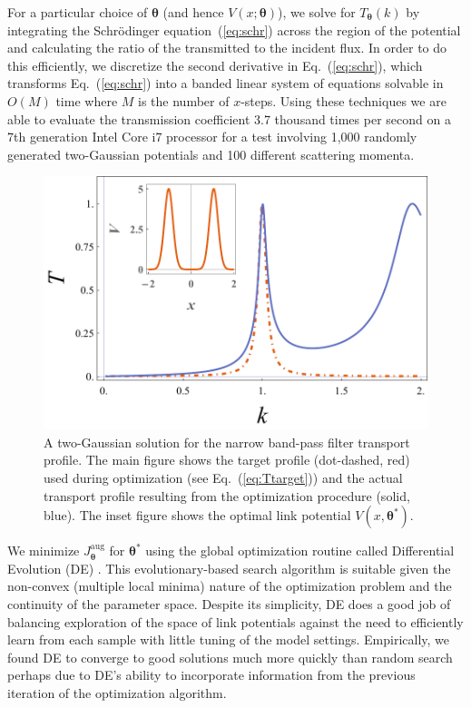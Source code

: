 \documentclass[reprint, twocolumn,amsmath,amssymb,showpacs,pra,superscriptaddress,aps]{revtex4-1}
\begin{document}
For a particular choice of $\bm{\theta}$ (and hence $V(x;\bm{\theta})$), we solve for $T_{\bm{\theta}}(k)$ by integrating the Schr{\"o}dinger equation~(\ref{eq:schr}) across the region of the potential and calculating the ratio of the transmitted to the incident flux. In order to do this efficiently, we discretize the second derivative in Eq.~(\ref{eq:schr}), which transforms Eq.~(\ref{eq:schr}) into
a banded linear system of equations solvable in $O(M)$ time where $M$ is the number of $x$-steps. Using these techniques we are able to evaluate the transmission coefficient 3.7 thousand times per second on a 7th generation Intel Core i7 processor for a test involving 1,000 randomly generated two-Gaussian potentials and 100 different scattering momenta. 

\begin{figure}
   \includegraphics[width=1\linewidth]{plot_transport_profiles_with_inset.pdf}
 \caption[Narrow band-pass filter link potential]{A two-Gaussian solution for the narrow band-pass filter transport profile. The main figure shows the target profile (dot-dashed, red) used during optimization (see Eq.~(\ref{eq:Ttarget})) and the actual transport profile resulting from the optimization procedure (solid, blue). The inset figure shows the optimal link potential $V(x, \bm{\theta^*})$.}
 \label{fig:method_illustration}
\end{figure}


We minimize $J_{\bm{\theta}}^{\mathrm{aug}}$ for $\bm{\theta}^*$ using the global optimization routine called Differential Evolution (DE) \cite{storn1997differential}. This evolutionary-based search algorithm is suitable given the non-convex (multiple local minima) nature of the optimization problem and the continuity of the parameter space. Despite its simplicity, DE does a good job of balancing exploration of the space of link potentials against the need to efficiently learn from each sample with little tuning of the model settings. Empirically, we found DE to converge to good solutions much more quickly than random search perhaps due to DE's ability to incorporate information from the previous iteration of the optimization algorithm. 
\end{document}
